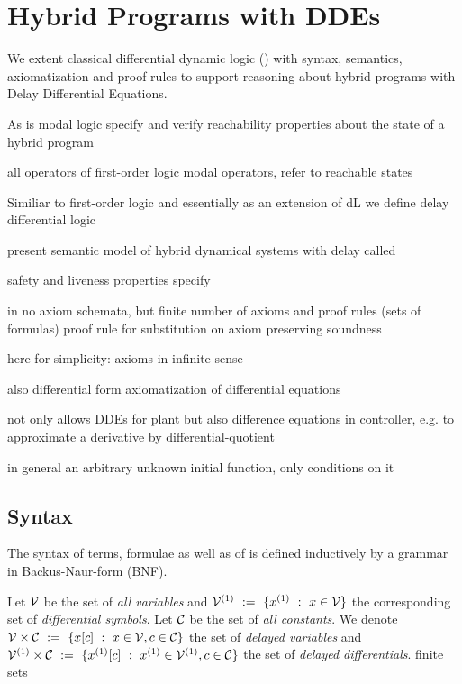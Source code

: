 \chapter{Hybrid Programs with DDEs}\label{hybrid-programs-with-ddes}


We extent classical differential dynamic logic (\dL) with syntax, semantics, axiomatization and proof rules to support reasoning about hybrid programs with Delay Differential Equations.

As \dL
\ddL is modal logic
specify and verify reachability properties about the state of a hybrid program

all operators of first-order logic
modal operators, refer to reachable states

Similiar to first-order logic and essentially as an extension of dL we define delay differential logic

present semantic model
of hybrid dynamical systems with delay
called \dHPs

safety and liveness properties specify

\dL in \cite{Platzer15Uniform} no axiom schemata, but finite number of axioms and proof rules (sets of formulas)
proof rule for substitution on axiom preserving soundness

here for simplicity: axioms in infinite sense

also differential form axiomatization of differential equations

\cite{Platzer12Complete,Platzer15Uniform}

\ddL not only allows DDEs for plant but also difference equations in controller, e.g. to approximate a derivative by differential-quotient

in general an arbitrary unknown initial function, only conditions on it



\section{Syntax}
    \label{sec:syntax}

    The syntax of \ddL terms, formulae as well as of \dHPs is defined inductively by a grammar in Backus-Naur-form (BNF).

    Let $\mathcal{V}$ be the set of \emph{all variables} and $\diffvars\defeq\{\D{x} \with x\in\allvars\}$ the corresponding set of \emph{differential symbols}.
    Let $\mathcal{C}_{}$ be the set of \emph{all constants}. We denote $\mathcal{V}\times\mathcal{C}_{}~\mathrel{\mathop{:}}=~\{x[c] ~\mathrel{\mathop{:}}~ x\in\mathcal{V}, c\in\mathcal{C}_{}\}$ the set of \emph{delayed variables} and $\delaydiffvars\defeq\{\Dx[c] \with \D{x}\in\diffvars, c\in\constants\}$ the set of \emph{delayed differentials}.
    finite sets

